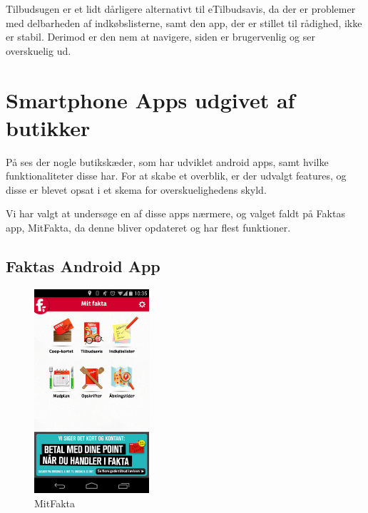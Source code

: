 Tilbudsugen er et lidt dårligere alternativt til eTilbudsavis, da der er problemer med delbarheden af indkøbslisterne, samt den app, der er stillet til rådighed, ikke er stabil.
Derimod er den nem at navigere, siden er brugervenlig og ser overskuelig ud.

\section{Smartphone Apps udgivet af butikker}
På  ses der nogle butikskæder, som har udviklet android apps, samt hvilke funktionaliteter disse har.  
For at skabe et overblik, er der udvalgt features, og disse er blevet opsat i et skema for overskuelighedens skyld. 

Vi har valgt at undersøge en af disse apps nærmere, og valget faldt på Faktas app, MitFakta, da denne bliver opdateret og har flest funktioner. 
\subsection{Faktas Android App}

\begin{figure}
\vspace{-20pt}
	\begin{center}
		\includegraphics[width=0.38\textwidth]{images/Images/MitFakta.png}
	\end{center}
	\vspace{-20pt}
	\caption{MitFakta}
	\vspace{-20pt}
	\label{ss:MitFakta}
\end{figure}

